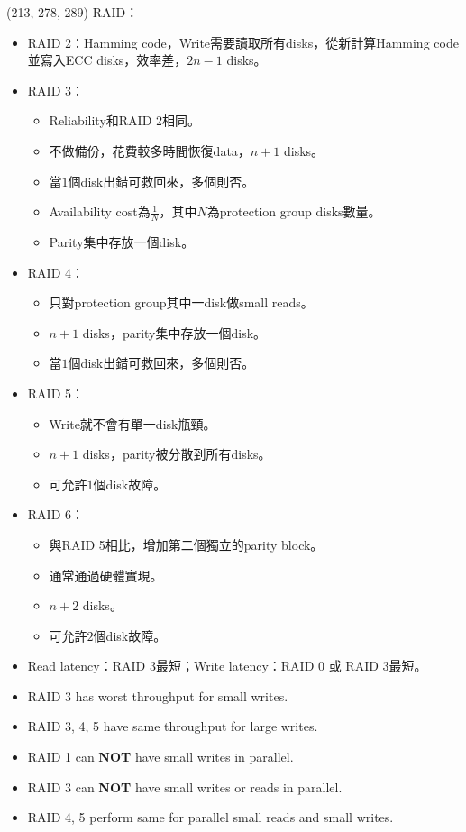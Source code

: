 \item \begin{theorem}{(213, 278, 289)} RAID：\begin{itemize}
        \item RAID 2：Hamming code，Write需要讀取所有disks，從新計算Hamming code並寫入ECC disks，效率差，$2n - 1$ disks。
        \item RAID 3：\begin{itemize}
            \item Reliability和RAID 2相同。
            \item 不做備份，花費較多時間恢復data，$n + 1$ disks。
            \item 當$1$個disk出錯可救回來，多個則否。
            \item Availability cost為$\frac{1}{N}$，其中$N$為protection group disks數量。
            \item Parity集中存放一個disk。
        \end{itemize}
        \item RAID 4：\begin{itemize}
            \item 只對protection group其中一disk做small reads。
            \item $n + 1$ disks，parity集中存放一個disk。
            \item 當$1$個disk出錯可救回來，多個則否。
        \end{itemize}
        \item RAID 5：\begin{itemize}
            \item Write就不會有單一disk瓶頸。
            \item $n + 1$ disks，parity被分散到所有disks。
            \item 可允許$1$個disk故障。
        \end{itemize}
        \item RAID 6：\begin{itemize}
            \item 與RAID 5相比，增加第二個獨立的parity block。
            \item 通常通過硬體實現。
            \item $n + 2$ disks。
            \item 可允許$2$個disk故障。
        \end{itemize}
        \item Read latency：RAID 3最短；Write latency：RAID 0 或 RAID 3最短。
        \item RAID 3 has worst throughput for small writes.
        \item RAID 3, 4, 5 have same throughput for large writes.
        \item RAID 1 can \textbf{NOT} have small writes in parallel.
        \item RAID 3 can \textbf{NOT} have small writes or reads in parallel. 
        \item RAID 4, 5 perform same for parallel small reads and small writes. 
    \end{itemize}
\end{theorem}